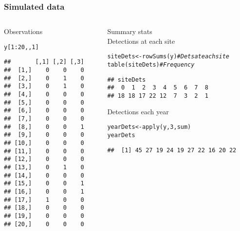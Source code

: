 \documentclass[color=usenames,dvipsnames]{beamer}\usepackage[]{graphicx}\usepackage[]{color}
\makeatletter
\newcommand{\hlnum}[1]{\textcolor[rgb]{0.69,0.494,0}{#1}}%
\newcommand{\hlcom}[1]{\textcolor[rgb]{0.514,0.506,0.514}{\textit{#1}}}%
\newcommand{\hlopt}[1]{\textcolor[rgb]{0,0,0}{#1}}%
\newcommand{\hlstd}[1]{\textcolor[rgb]{0,0,0}{#1}}%
\newcommand{\hlkwb}[1]{\textcolor[rgb]{0,0.341,0.682}{#1}}%
\newcommand{\hlkwd}[1]{\textcolor[rgb]{0.004,0.004,0.506}{#1}}%
\newenvironment{kframe}{%
 \def\at@end@of@kframe{}%
 \ifinner\ifhmode%
  \def\at@end@of@kframe{\end{minipage}}%
  \begin{minipage}{\columnwidth}%
 \fi\fi%
 \def\FrameCommand##1{\hskip\@totalleftmargin \hskip-\fboxsep
 \colorbox{shadecolor}{##1}\hskip-\fboxsep
     \hskip-\linewidth \hskip-\@totalleftmargin \hskip\columnwidth}%
 \MakeFramed {\advance\hsize-\width
   \@totalleftmargin\z@ \linewidth\hsize
   \@setminipage}}%
 {\par\unskip\endMakeFramed%
 \at@end@of@kframe}
\newenvironment{knitrout}{}{} %
\makeatother
\begin{document}
\begin{frame}[fragile]
  \frametitle{Simulated data}
  \begin{columns}
    \begin{column}{0.4\textwidth}
      \small
      Observations
\begin{knitrout}\scriptsize
{}\color{fgcolor}\begin{kframe}
\begin{alltt}
\hlstd{y[}\hlnum{1}\hlopt{:}\hlnum{20}\hlstd{,,}\hlnum{1}\hlstd{]}
\end{alltt}
\begin{verbatim}
##       [,1] [,2] [,3]
##  [1,]    0    0    0
##  [2,]    0    1    0
##  [3,]    0    1    0
##  [4,]    0    0    0
##  [5,]    0    0    0
##  [6,]    0    0    0
##  [7,]    0    0    0
##  [8,]    0    0    1
##  [9,]    0    0    0
## [10,]    0    0    0
## [11,]    0    0    0
## [12,]    0    0    0
## [13,]    0    1    0
## [14,]    0    0    0
## [15,]    0    0    1
## [16,]    0    0    1
## [17,]    1    0    0
## [18,]    0    0    0
## [19,]    0    0    0
## [20,]    0    0    0
\end{verbatim}
\end{kframe}
\end{knitrout}
  \end{column}
  \begin{column}{0.6\textwidth}
    \pause
    {\centering Summary stats \\}
    \vspace{24pt}
  Detections at each site \\
\begin{knitrout}\scriptsize
{}\color{fgcolor}\begin{kframe}
\begin{alltt}
\hlstd{siteDets} \hlkwb{<-} \hlkwd{rowSums}\hlstd{(y)} \hlcom{# Dets at each site}
\hlkwd{table}\hlstd{(siteDets)}        \hlcom{# Frequency}
\end{alltt}
\begin{verbatim}
## siteDets
##  0  1  2  3  4  5  6  7  8 
## 18 18 17 22 12  7  3  2  1
\end{verbatim}
\end{kframe}
\end{knitrout}
\pause
\vfill
\small
Detections each year \\
\begin{knitrout}\scriptsize
{}\color{fgcolor}\begin{kframe}
\begin{alltt}
\hlstd{yearDets} \hlkwb{<-} \hlkwd{apply}\hlstd{(y,} \hlnum{3}\hlstd{, sum)}
\hlstd{yearDets}
\end{alltt}
\begin{verbatim}
##  [1] 45 27 19 24 19 27 22 16 20 22
\end{verbatim}
\end{kframe}
\end{knitrout}


\end{column}
\end{columns}
\end{frame}
\end{document}
